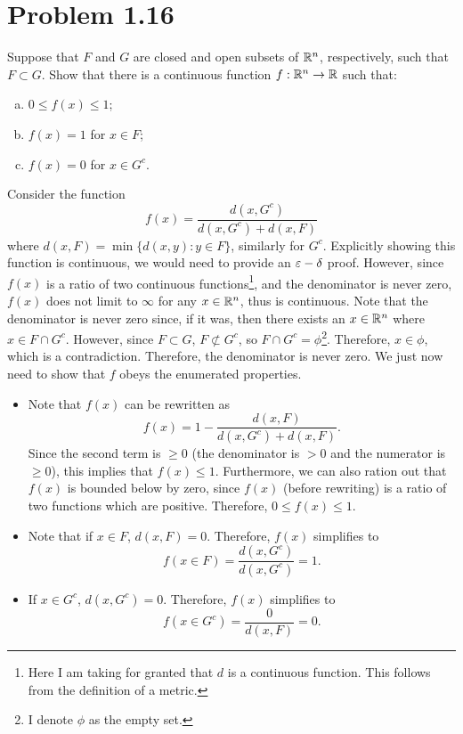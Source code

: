 \newpage
\section{Problem 1.16}
Suppose that $F$ and $G$ are closed and open subsets of $\mathbb{R}^n$, respectively, such that $F \subset G$. Show that there is a continuous function $f: \mathbb{R}^n \rightarrow \mathbb{R}$ such that:
\begin{enumerate}[(a)]
    \item $0 \leq f(x) \leq 1$;
    \item $f(x) = 1$ for $x \in F$;
    \item $f(x) = 0$ for $x \in G^c$.
\end{enumerate}
\partbreak
\begin{solution}

    Consider the function
    \[
    f(x) = \frac{d(x, G^c)}{d(x, G^c) + d(x, F)}
    \]
    where $d(x, F) = \min \{ d(x, y) : y \in F \}$, similarly for $G^c$. Explicitly showing this function is continuous, we would need to provide an $\varepsilon -\delta$ proof. However, since $f(x)$ is a ratio of two continuous functions\footnote{Here I am taking for granted that $d$ is a continuous function. This follows from the definition of a metric.}, and the denominator is never zero, $f(x)$ does not limit to $\infty$ for any $x \in \mathbb{R}^n$, thus is continuous. Note that the denominator is never zero since, if it was, then there exists an $x \in \mathbb{R}^n$ where $x \in F\cap G^c$. However, since $F \subset G$, $F \not\subset G^c$, so $F\cap G^c = \phi$\footnote{I denote $\phi$ as the empty set.}. Therefore, $x \in \phi$, which is a contradiction. Therefore, the denominator is never zero. We just now need to show that $f$ obeys the enumerated properties.

    \begin{itemize}[(a)]
        \item Note that $f(x)$ can be rewritten as
        \[
        f(x) = 1 - \frac{d(x, F)}{d(x, G^c) + d(x, F)}.
        \]
        Since the second term is $\geq 0$ (the denominator is $>0$ and the numerator is $\geq 0$), this implies that $f(x) \leq 1$. Furthermore, we can also ration out that $f(x)$ is bounded below by zero, since $f(x)$ (before rewriting) is a ratio of two functions which are positive. Therefore, $0 \leq f(x) \leq 1$.
        \item Note that if $x \in F$, $d(x, F) = 0$. Therefore, $f(x)$ simplifies to 
        \[
        f(x \in F) = \frac{d(x, G^c)}{d(x, G^c)} = 1.
        \]
        \item If $x \in G^c$, $d(x, G^c) = 0$. Therefore, $f(x)$ simplifies to 
        \[
        f(x \in G^c) = \frac{0}{d(x, F)} = 0.
        \]
    \end{itemize}
\end{solution}
\newpage
